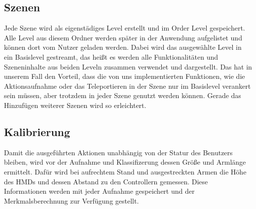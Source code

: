 \subsection{Szenen}
Jede Szene wird als eigenstädiges Level erstellt und im Order \glqq{}Level\grqq{} gespeichert. Alle Level aus diesem Ordner werden später in der Anwendung aufgelistet und können dort vom Nutzer geladen werden. Dabei wird das ausgewählte Level in ein Basislevel \glqq{}gestreamt\grqq{}, das heißt es werden alle Funktionalitäten und Szeneninhalte aus beiden Leveln zusammen verwendet und dargestellt. Das hat in unserem Fall den Vorteil, dass die von uns implementierten Funktionen, wie die Aktionsaufnahme oder das Teleportieren in der Szene nur im Basislevel verankert sein müssen, aber trotzdem in jeder Szene genutzt werden können. Gerade das Hinzufügen weiterer Szenen wird so erleichtert.

\subsection{Kalibrierung}
Damit die ausgeführten Aktionen unabhängig von der Statur des Benutzers bleiben, wird vor der Aufnahme und Klassifizerung dessen Größe und Armlänge ermittelt. Dafür wird bei aufrechtem Stand und ausgestreckten Armen die Höhe des HMDs und dessen Abstand zu den Controllern gemessen. Diese Informationen werden mit jeder Aufnahme gespeichert und der Merkmalsberechnung zur Verfügung gestellt. 

